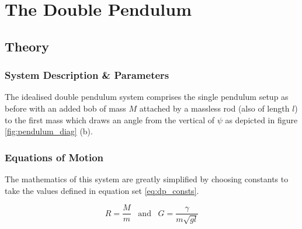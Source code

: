 \documentclass[11pt]{article}
\begin{document}

\section{The Double Pendulum}
\subsection{Theory}
\subsubsection*{System Description \& Parameters}
The idealised double pendulum system comprises the single pendulum setup as before with an added bob of mass $M$ attached by a massless rod (also of length $l$) to the first mass which draws an angle from the vertical of $\psi$ as depicted in figure \ref{fig:pendulum_diag} (b).

\subsubsection*{Equations of Motion}

The mathematics of this system are greatly simplified by choosing constants to take the values defined in equation set \ref{eq:dp_consts}.

\begin{equation} \label{eq:dp_consts}
	R = \frac{M}{m} \;\;\; \text{and} \;\;\; G = \frac{\gamma}{m \sqrt{gl}}
\end{equation}
\end{document}
